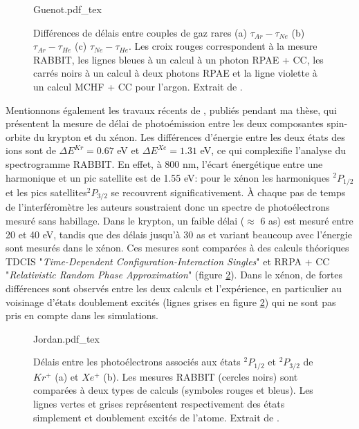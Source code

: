 \begin{figure}
\centering
\def\svgwidth{\textwidth}
{Guenot.pdf_tex}
\caption{Différences de délais entre couples de gaz rares (a) $\tau_{Ar} - \tau_{Ne}$ (b) $\tau_{Ar} - \tau_{He}$ (c) $\tau_{Ne} - \tau_{He}$. Les croix rouges correspondent à la mesure RABBIT, les lignes bleues à un calcul à un photon RPAE + CC, les carrés noirs à un calcul à deux photons RPAE et la ligne violette à un calcul MCHF + CC pour l'argon. Extrait de .}
\label{fig:Guenot}
\end{figure}

Mentionnons également les travaux récents de , publiés pendant ma thèse, qui présentent la mesure de délai de photoémission entre les deux composantes spin-orbite du krypton et du xénon. Les différences d'énergie entre les deux états des ions sont de $\Delta E^{Kr} = 0.67$ eV et $\Delta E^{Xe} = 1.31$ eV, ce qui complexifie l'analyse du spectrogramme RABBIT. En effet, à 800 nm, l'écart énergétique entre une harmonique et un pic satellite est de 1.55 eV: pour le xénon les harmoniques $^2P_{1/2}$ et les pics satellites$^2P_{3/2}$ se recouvrent significativement. \`A chaque pas de temps de l'interféromètre les auteurs soustraient donc un spectre de photoélectrons mesuré sans habillage. Dans le krypton, un faible délai ($\approx$ 6 as) est mesuré entre 20 et 40 eV, tandis que des délais jusqu'à 30 as et variant beaucoup avec l'énergie sont mesurés dans le xénon. Ces mesures sont comparées à des calculs théoriques TDCIS "\textit{Time-Dependent Configuration-Interaction Singles}" et RRPA + CC "\textit{Relativistic Random Phase Approximation}" (figure \ref{fig:Jordan}). Dans le xénon, de fortes différences sont observés entre les deux calculs et l'expérience, en particulier au voisinage d'états doublement excités (lignes grises en figure \ref{fig:Jordan}) qui ne sont pas pris en compte dans les simulations.
\begin{figure}
\centering
\def\svgwidth{0.6\textwidth}
{Jordan.pdf_tex}
\caption{Délais entre les photoélectrons associés aux états $^2P_{1/2}$ et $^2P_{3/2}$ de $Kr^+$ (a) et $Xe^+$ (b). Les mesures RABBIT (cercles noirs) sont comparées à deux types de calculs (symboles rouges et bleus). Les lignes vertes et grises représentent respectivement des états simplement et doublement excités de l'atome. Extrait de .}
\label{fig:Jordan}
\end{figure}


